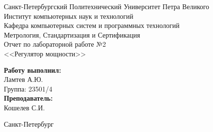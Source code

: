 \begin{titlepage}	%

	\begin{center}		%

		\normalsize Санкт-Петербургский Политехнический Университет Петра Великого\\
		\normalsize Институт компьютерных наук и технологий \\
		\normalsize Кафедра компьютерных систем и программных технологий\\[6cm]
		
		\Large Метрология, Стандартизация и Сертификация\\[0.5cm] %
		\normalsize Отчет по лабораторной работе №2\\[0.1cm]
		\normalsize <<Регулятор мощности>>\\[8cm]

	\end{center}


	\begin{flushright} %
		\begin{minipage}{0.30\textwidth} %
			\begin{flushleft} %

				\normalsize\textbf{Работу выполнил:}\\
				\normalsize Ламтев А.Ю.\\
				\normalsize {Группа:} 23501/4\\
				
				\normalsize \textbf{Преподаватель:}\\
				\normalsize Кошелев С.И.

			\end{flushleft}
		\end{minipage}
	\end{flushright}
	
	\vfill %

	\begin{center}
	\large Санкт-Петербург\\
	\large \the\year %
	\end{center} %

\thispagestyle{empty} %
\end{titlepage} %

\vfill %
